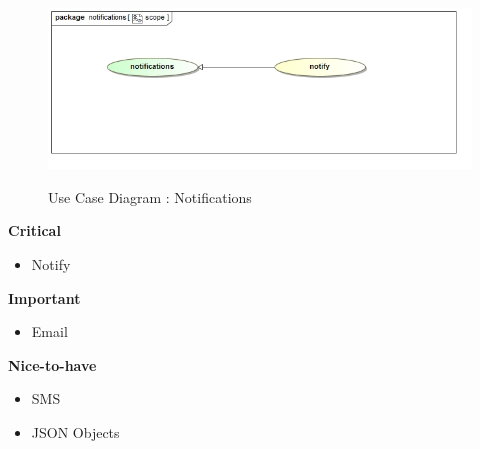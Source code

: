 \documentclass{article}
\begin{document}
		\begin{figure}[H]
		\includegraphics[width=\textwidth]{images/uc__notifications__scope.jpg}  \\
		\caption{Use Case Diagram : Notifications}
		\end{figure}

		\begin{flushleft}
			\textbf{Critical}
				\begin{itemize}
					\item Notify
				\end{itemize}
			\textbf{Important}
				\begin{itemize}
					\item Email
				\end{itemize}
			\textbf{Nice-to-have}
				\begin{itemize}
					\item SMS
					\item JSON Objects
				\end{itemize}
		\end{flushleft}
\end{document}
